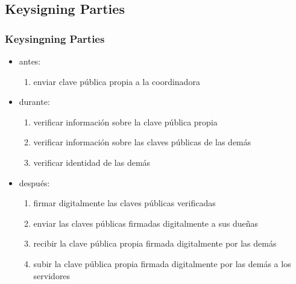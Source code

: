 \documentclass{beamer}
\let\olditem\item
\renewcommand{\item}{%
\olditem\vspace{3pt}}
\begin{document}
\subsection{Keysigning Parties}
\begin{frame}
\frametitle{Keysingning Parties}
\begin{itemize}
    \item antes:
        \begin{enumerate}
            \item enviar clave pública propia a la coordinadora
        \end{enumerate}
    \item durante:
        \begin{enumerate}
            \item verificar información sobre la clave pública propia
            \item verificar información sobre las claves públicas de las demás
            \item verificar identidad de las demás
        \end{enumerate}
    \item después:
        \begin{enumerate}
            \item firmar digitalmente las claves públicas verificadas
            \item enviar las claves públicas firmadas digitalmente a sus dueñas
            \item recibir la clave pública propia firmada digitalmente por las demás
            \item subir la clave pública propia firmada digitalmente por las
                demás a los servidores
        \end{enumerate}
\end{itemize}
\end{frame}
\end{document}
